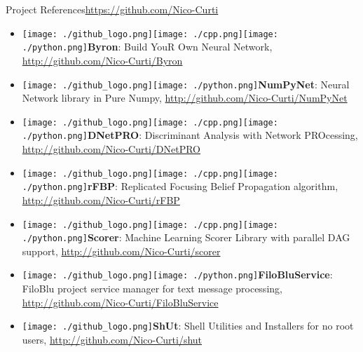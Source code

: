\documentclass[10pt, technote, oribibl, unicode]{beamer}
\begin{document}
\begin{frame}{Project References}{\url{https://github.com/Nico-Curti}}


  \begin{itemize}

    \item[] \texttt{[image: ./github\_logo.png]}\quad\texttt{[image: ./cpp.png]}\quad\texttt{[image: ./python.png]}\quad \textbf{Byron}: Build YouR Own Neural Network, \url{http://github.com/Nico-Curti/Byron}

    \item[] \texttt{[image: ./github\_logo.png]}\quad\texttt{[image: ./python.png]}\quad \textbf{NumPyNet}: Neural Network library in Pure Numpy, \url{http://github.com/Nico-Curti/NumPyNet}

    \item[] \texttt{[image: ./github\_logo.png]}\quad\texttt{[image: ./cpp.png]}\quad\texttt{[image: ./python.png]}\quad \textbf{DNetPRO}: Discriminant Analysis with Network PROcessing, \url{http://github.com/Nico-Curti/DNetPRO}

    \item[] \texttt{[image: ./github\_logo.png]}\quad\texttt{[image: ./cpp.png]}\quad\texttt{[image: ./python.png]}\quad \textbf{rFBP}: Replicated Focusing Belief Propagation algorithm, \url{http://github.com/Nico-Curti/rFBP}

    \item[] \texttt{[image: ./github\_logo.png]}\quad\texttt{[image: ./cpp.png]}\quad\texttt{[image: ./python.png]}\quad \textbf{Scorer}: Machine Learning Scorer Library with parallel DAG support, \url{http://github.com/Nico-Curti/scorer}

    \item[] \texttt{[image: ./github\_logo.png]}\quad\texttt{[image: ./python.png]}\quad \textbf{FiloBluService}: FiloBlu project service manager for text message processing, \url{http://github.com/Nico-Curti/FiloBluService}

    \item[] \texttt{[image: ./github\_logo.png]}\quad \textbf{ShUt}: Shell Utilities and Installers for no root users, \url{http://github.com/Nico-Curti/shut}


\end{itemize}
\end{frame}
\end{document}
